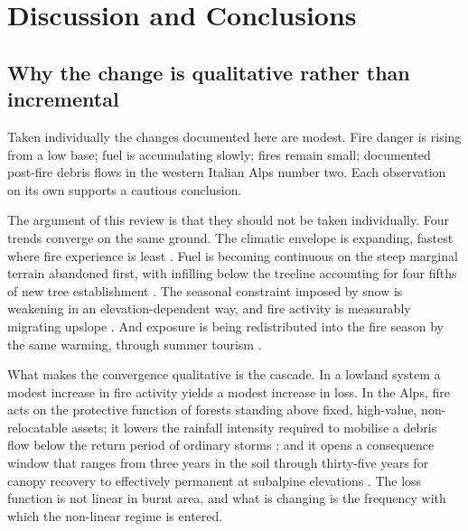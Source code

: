 \documentclass[11pt,a4paper]{article}
\begin{document}
\section{Discussion and Conclusions}

\subsection{Why the change is qualitative rather than incremental}

Taken individually the changes documented here are modest. Fire danger is rising from a low base; fuel is accumulating slowly; fires remain small; documented post-fire debris flows in the western Italian Alps number two. Each observation on its own supports a cautious conclusion.

The argument of this review is that they should not be taken individually. Four trends converge on the same ground. The climatic envelope is expanding, fastest where fire experience is least \citep{gerberding_mapping_2025, miller_climate_2024}. Fuel is becoming continuous on the steep marginal terrain abandoned first, with infilling below the treeline accounting for four fifths of new tree establishment \citep{frei_evidence_2023, garbarino_contrasting_2020, conedera_linking_2024}. The seasonal constraint imposed by snow is weakening in an elevation-dependent way, and fire activity is measurably migrating upslope \citep{rangwala_climate_2012, beloiu_climatedriven_2026}. And exposure is being redistributed into the fire season by the same warming, through summer tourism \citep{pede_mountain_2022}.

What makes the convergence qualitative is the cascade. In a lowland system a modest increase in fire activity yields a modest increase in loss. In the Alps, fire acts on the protective function of forests standing above fixed, high-value, non-relocatable assets; it lowers the rainfall intensity required to mobilise a debris flow below the return period of ordinary storms \citep{laporta_postwildfire_2025}; and it opens a consequence window that ranges from three years in the soil \citep{negri_wildfire_2026} through thirty-five years for canopy recovery \citep{stritih_alternative_2023} to effectively permanent at subalpine elevations \citep{degiuli_arrested_2024}. The loss function is not linear in burnt area, and what is changing is the frequency with which the non-linear regime is entered.
\end{document}
